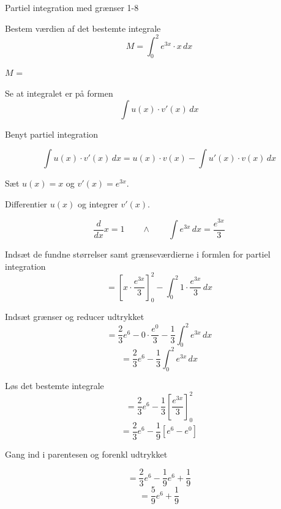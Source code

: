 \documentclass{article}
\begin{document}
\newpage

\begin{exercise}{Partiel integration med grænser 1-8}
	
	
	Bestem værdien af det bestemte integrale
	\[
	M = \int_0^2 e^{3x} \cdot x \, dx
	\]
	
	$M$ =  
	
	
	\hint
	
	Se at integralet er på formen
	\[
	\int u(x) \cdot v'(x) \, dx
	\]
	
	\hint
	
	Benyt partiel integration
	
	\hint
	\[
	\int u(x) \cdot v'(x)\, dx = u(x) \cdot v(x) - \int u'(x) \cdot v(x) \, dx
	\]
	\hint
	
	Sæt $u(x) = x$ og $v'(x) = e^{3x}$.
	
	
	\hint
	
	Differentier $u(x)$ og integrer $v'(x)$.
	
	\hint
	\[
	\frac{d}{dx}x = 1 \qquad \wedge \qquad \int e^{3x} \, dx = \frac{e^{3x}}{3}
	\]
	
	\hint
	
	Indsæt de fundne størrelser samt grænseværdierne i formlen for partiel integration 
	\[
	= \left[x \cdot \frac{e^{3x}}{3}\right]_{0}^{2} - \int_{0}^{2} 1 \cdot \frac{e^{3x}}{3} \, dx
	\]
	
	\hint
	
	Indsæt grænser og reducer udtrykket
	\[
	= \frac{2}{3} e^6 - 0 \cdot \frac{e^0}{3}  -  \frac{1}{3} \int_{0}^{2} e^{3x} \, dx
	\]
	\[
	= \frac{2}{3} e^6 - \frac{1}{3} \int_{0}^{2} e^{3x} \, dx 
	\]
	
	\hint
	Løs det bestemte integrale
	\[
	= \frac{2}{3} e^6 - \frac{1}{3} \left[\frac{e^{3x}}{3} \right]_0^2
	\]
	\[
	= \frac{2}{3} e^6 - \frac{1}{9} \left[e^{6}-e^0\right] 
	\]
	
	\hint
	Gang ind i parentesen og forenkl udtrykket
	
	\hint
	\[
	= \frac{2}{3} e^6 - \frac{1}{9} e^{6} + \frac{1}{9}
	\]
	\[
	= \frac{5}{9} e^6 + \frac{1}{9}
	\]
	
	
	
\end{exercise}
\end{document}
